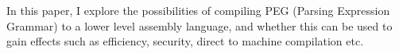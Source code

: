 In this paper, I explore the possibilities of compiling PEG
(Parsing Expression Grammar) \cite{bib:peg}
to a lower level assembly language, and whether this can be
used to gain effects such as efficiency, security, direct
to machine compilation etc.

